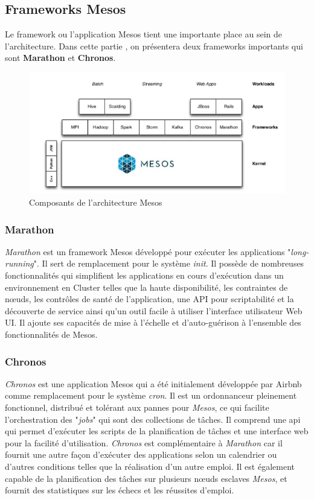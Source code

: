 \begin{onehalfspace}
\subsection{Frameworks Mesos}
Le framework ou l'application Mesos tient une importante place au sein de l'architecture. Dans cette partie , on présentera deux frameworks importants qui sont \textbf{Marathon} et \textbf{Chronos}.
\begin{figure}[H]
\centering
\includegraphics [scale=0.65]{chapitre3/assets/framework.png}
\caption{Composants de l'architecture Mesos \cite{mesos2}}
\end{figure}
\subsubsection*{Marathon}
\emph{Marathon} est un framework Mesos développé pour exécuter les applications "\emph{long-running}". Il sert de remplacement pour le système \emph{init}. Il possède de nombreuses fonctionnalités qui simplifient les applications en cours d'exécution dans un environnement en Cluster telles que la haute disponibilité, les contraintes de nœuds, les contrôles de santé de l'application, une API pour scriptabilité et la découverte de service ainsi qu'un outil facile à utiliser l'interface utilisateur Web UI. Il ajoute ses capacités de mise à l'échelle et d'auto-guérison à l'ensemble des fonctionnalités de Mesos. 
\subsubsection*{Chronos}
\emph{Chronos} est une application Mesos qui a été initialement développée par Airbnb comme remplacement pour le système \emph{cron}. Il est un ordonnanceur pleinement fonctionnel, distribué et tolérant aux pannes pour \emph{Mesos}, ce qui facilite l'orchestration des "\emph{jobs}" qui sont des collections de tâches. Il comprend une \acrshort{api} qui permet d'exécuter les scripts de la planification de tâches et une interface web pour la facilité d'utilisation.
\emph{Chronos} est complémentaire à \emph{Marathon} car il fournit une autre façon d'exécuter des applications selon un calendrier ou d'autres conditions telles que la réalisation d'un autre emploi. Il est également capable de la planification des tâches sur plusieurs nœuds esclaves \emph{Mesos}, et fournit des statistiques sur les échecs et les réussites d'emploi.

\end{onehalfspace}
